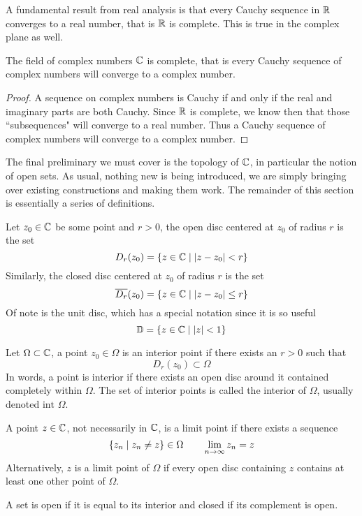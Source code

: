 A fundamental result from real analysis is that every Cauchy sequence in $\mathbb{R}$ converges to a real number, that is $\mathbb{R}$ is complete. This is true in the complex plane as well.

\begin{theorem}[Completeness of $\cx$]
	The field of complex numbers $\cx$ is complete, that is every Cauchy sequence of complex numbers will converge to a complex number.
\end{theorem}
\begin{proof}
	A sequence on complex numbers is Cauchy if and only if the real and imaginary parts are both Cauchy. Since $\mathbb{R}$ is complete, we know then that those ``subsequences" will converge to a real number. Thus a Cauchy sequence of complex numbers will converge to a complex number.
\end{proof}

The final preliminary we must cover is the topology of $\cx$, in particular the notion of open sets. As usual, nothing new is being introduced, we are simply bringing over existing constructions and making them work. The remainder of this section is essentially a series of definitions.

Let $z_0 \in \mathbb{C}$ be some point and $r > 0$, the open disc centered at $z_0$ of radius $r$ is the set
\[ D_r(z_0) = \left\{z \in \mathbb{C} \mid \abs{z - z_0} < r\right\} \]
Similarly, the closed disc centered at $z_0$ of radius $r$ is the set 
\[ \overline{D_r}(z_0) = \left\{z \in \mathbb{C} \mid \abs{z - z_0} \leq r\right\} \]
Of note is the unit disc, which has a special notation since it is so useful
\[ \mathbb{D} = \left\{z \in \mathbb{C} \mid |z| < 1\right\} \]

\begin{definition}
	Let $\Omega \subset \mathbb{C}$, a point $z_0 \in \Omega$ is an interior point if there exists an $r > 0$ such that
	\[ D_r(z_0) \subset \Omega \]
	In words, a point is interior if there exists an open disc around it contained completely within $\Omega$. The set of interior points is called the interior of $\Omega$, usually denoted $\text{int } \Omega$. 
	
	A point $z \in \mathbb{C}$, not necessarily in $\cx$, is a limit point if there exists a sequence
	\[ \left\{z_n \mid z_n \neq z\right\} \in \Omega \qquad \lim_{n \to \infty} z_n = z \]
	Alternatively, $z$ is a limit point of $\Omega$ if every open disc containing $z$ contains at least one other point of $\Omega$.
\end{definition}

A set is open if it is equal to its interior and closed if its complement is open. 

